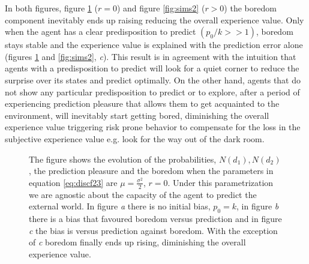 \documentclass[11pt, onecolumn]{article}
\begin{document}
In both figures, figure \ref{fig:sims1} ($r=0$) and figure \ref{fig:sims2} ($r>0$) the boredom component inevitably ends up raising reducing the overall experience value. Only when the agent has a clear predisposition to predict $(p_0/k >> 1)$, boredom stays stable and the experience value is explained with the prediction error alone (figures \ref{fig:sims1} and \ref{fig:sims2}, \emph{c}). This result is in agreement with the intuition that agents with a predisposition to predict will look for a quiet corner to reduce the surprise over its states and predict optimally. On the other hand, agents that do not show any particular predisposition to predict or to explore, after a period of experiencing prediction pleasure that allows them to get acquainted to the environment, will inevitably start getting bored, diminishing the overall experience value triggering risk prone behavior to compensate for the loss in the subjective experience value e.g. look for the way out of the dark room.

\begin{figure}[H]
    \subfigure[\label{subfig-1:dummy}]{%
      \texttt{[image: r=0k=s-inv.png]}
    }
    \hfill
    \subfigure[\label{subfig-2:dummy}]{%
      \texttt{[image: r=0k=10s-inv.png]}
    }
    \hfill
    \subfigure[\label{subfig-3:dummy}]{%
      \texttt{[image: r=0s=10k-inv.png]}
    }
    \caption{The figure shows the evolution of the probabilities, $N(d_1), N(d_2)$, the prediction pleasure and the boredom when the parameters in equation \ref{eq:discf23} are $ \mu = \frac{\sigma ^2}{2}$, $r=0$. Under this parametrization we are agnostic about the capacity of the agent to predict the external world. In figure \emph{a} there is no initial bias, $p_0 = k$, in figure \emph{b} there is a bias that favoured boredom versus prediction and in figure \emph{c} the bias is versus prediction against boredom. With the exception of \emph{c} boredom finally ends up rising, diminishing the overall experience value.}
    \label{fig:sims1}
\end{figure}
\end{document}
